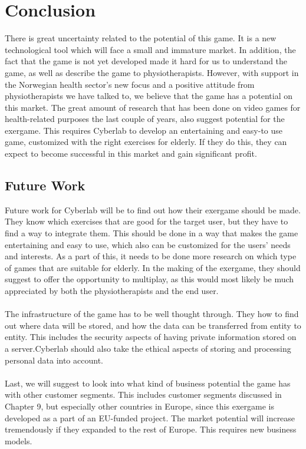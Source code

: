 \chapter{Conclusion}
There is great uncertainty related to the potential of this game. It is a new technological tool which will face a small and immature market. In addition, the fact that the game is not yet developed made it hard for us to understand the game, as well as describe the game to physiotherapists. However, with support in the Norwegian health sector's new focus and a positive attitude from physiotherapists we have talked to, we believe that the game has a potential on this market. The great amount of research that has been done on video games for health-related purposes the last couple of years, also suggest potential for the exergame. This requires Cyberlab to develop an entertaining and easy-to use game, customized with the right exercises for elderly. If they do this, they can expect to become successful in this market and gain significant profit.  
\section{Future Work}
Future work for Cyberlab will be to find out how their exergame should be made. They know which exercises that are good for the target user, but they have to find a way to integrate them.  This should be done in a way that makes the game entertaining and easy to use, which also can be customized for the users’ needs and interests. As a part of this, it needs to be done more research on which type of games that are suitable for elderly.  In the making of the exergame, they should suggest to offer the opportunity to multiplay, as this would most likely be much appreciated by both the physiotherapists and the end user. \\ \\
The infrastructure of the game has to be well thought through. They how to find out where data will be stored, and how the data can be transferred from entity to entity. This includes the security aspects of having private information stored on a server.Cyberlab should also take the ethical aspects of storing and processing personal data into account. \\ \\
Last, we will suggest to look into what kind of business potential the game has with other customer segments. This includes customer segments discussed in Chapter 9, but especially other countries in Europe, since this exergame is developed as a part of an EU-funded project. The market potential will increase tremendously if they expanded to the rest of Europe. This requires new business models. \\ \\